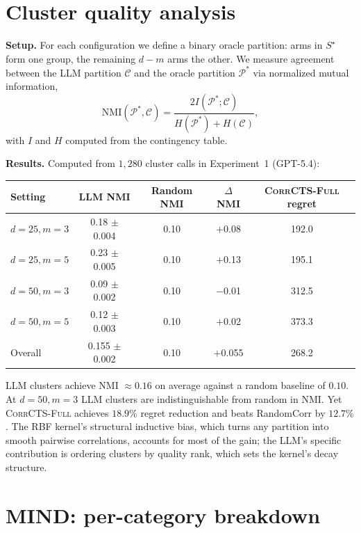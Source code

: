 \documentclass{article}
\theoremstyle{plain}
\theoremstyle{definition}
\theoremstyle{remark}
\newcommand{\opt}{S^{\star}}
\newcommand{\CorrFull}{\textsc{CorrCTS-Full}}
\begin{document}
\section{Cluster quality analysis}\label{app:info}

\textbf{Setup.}
For each configuration we define a binary oracle partition: arms in $\opt$ form one group, the remaining $d - m$ arms the other.
We measure agreement between the LLM partition $\mathcal{C}$ and the oracle partition $\mathcal{P}^*$ via normalized mutual information,
\[
\text{NMI}(\mathcal{P}^*, \mathcal{C}) = \frac{2 I(\mathcal{P}^*; \mathcal{C})}{H(\mathcal{P}^*) + H(\mathcal{C})},
\]
with $I$ and $H$ computed from the contingency table.

\textbf{Results.}
Computed from $1{,}280$ cluster calls in Experiment~1 (GPT-5.4):

\begin{center}
\small
\begin{tabular}{@{}lcccc@{}}
\toprule
Setting & LLM NMI & Random NMI & $\Delta$NMI & \CorrFull{} regret \\
\midrule
$d{=}25, m{=}3$ & 0.18 $\pm$ 0.004 & 0.10 & $+$0.08 & 192.0 \\
$d{=}25, m{=}5$ & 0.23 $\pm$ 0.005 & 0.10 & $+$0.13 & 195.1 \\
$d{=}50, m{=}3$ & 0.09 $\pm$ 0.002 & 0.10 & $-$0.01 & 312.5 \\
$d{=}50, m{=}5$ & 0.12 $\pm$ 0.003 & 0.10 & $+$0.02 & 373.3 \\
\midrule
Overall & 0.155 $\pm$ 0.002 & 0.10 & $+$0.055 & 268.2 \\
\bottomrule
\end{tabular}
\end{center}

LLM clusters achieve NMI $\approx 0.16$ on average against a random baseline of $0.10$.
At $d = 50, m = 3$ LLM clusters are indistinguishable from random in NMI.
Yet \CorrFull{} achieves $18.9\%$ regret reduction and beats RandomCorr by $12.7\%$.
The RBF kernel's structural inductive bias, which turns any partition into smooth pairwise correlations, accounts for most of the gain; the LLM's specific contribution is ordering clusters by quality rank, which sets the kernel's decay structure.

\section{MIND: per-category breakdown}\label{app:mindcats}
\end{document}
